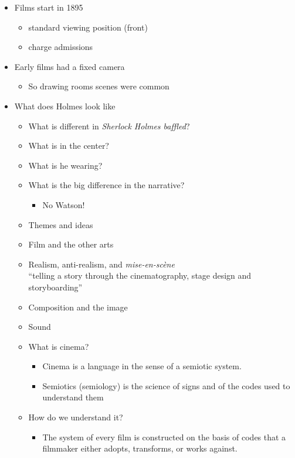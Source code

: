 \documentclass[a4paper,landscape,headrule,footrule,xetex]{foils}
\begin{document}
\begin{itemize}
\item Films start in 1895 
  \begin{itemize}
  \item  standard viewing position (front)
  \item  charge admissions
  \end{itemize}
\item Early films had a fixed camera
  \begin{itemize}
  \item So drawing rooms scenes were common
  \end{itemize}
\item What does Holmes look like \task
  \begin{itemize}
  \item What is different in \textit{Sherlock Holmes baffled}?
  \item What is in the center?
  \item What is he wearing?
  \item What is the big difference in the narrative?
    \begin{itemize}
    \item No Watson!
    \end{itemize}
  \end{itemize}
  
\begin{itemize}
\item Themes and ideas
\item Film and the other arts
\item Realism, anti-realism, and \textit{mise-en-scène}
\\ ``telling a story through the cinematography, stage design and storyboarding''
\item Composition and the image
\item Sound
\end{itemize}

\begin{itemize}
\item What is cinema?
  \begin{itemize}
  \item Cinema is a language in the sense of a
semiotic system.
\item Semiotics (semiology) is the science of
signs and of the codes used to understand
them
\end{itemize}
\item How do we understand it?
  \begin{itemize}
  \item The system of every film is constructed on
the basis of codes that a filmmaker either
adopts, transforms, or works against.


\end{itemize}
\end{itemize}
\end{itemize}
\end{document}
